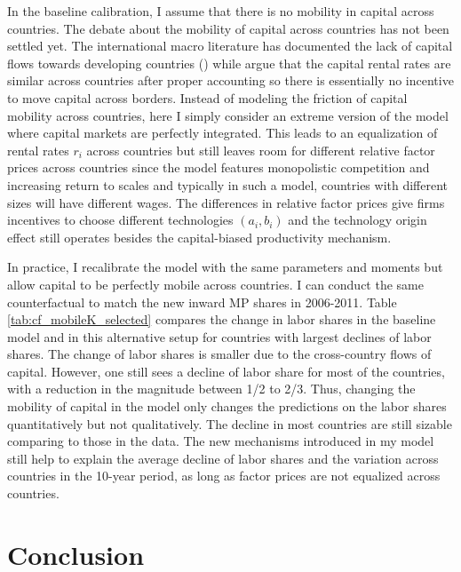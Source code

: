 \documentclass[notitlepage,11pt]{article}%
\begin{document}
In the baseline calibration, I assume that there is no mobility in capital
across countries. The debate about the mobility of capital across countries
has not been settled yet. The international macro literature has documented
the lack of capital flows towards developing countries (\cite{lucas_why_1990})
while \cite{caselli_marginal_2007} argue that the capital rental rates are
similar across countries after proper accounting so there is essentially no
incentive to move capital across borders. Instead of modeling the friction of
capital mobility across countries, here I simply consider an extreme version
of the model where capital markets are perfectly integrated. This leads to an
equalization of rental rates $r_{i}$ across countries but still leaves room
for different relative factor prices across countries since the model features
monopolistic competition and increasing return to scales and typically in such
a model, countries with different sizes will have different wages. The
differences in relative factor prices give firms incentives to choose
different technologies $\left(  a_{i},b_{i}\right)  $ and the technology
origin effect still operates besides the capital-biased productivity mechanism.

In practice, I recalibrate the model with the same parameters and moments but
allow capital to be perfectly mobile across countries. I can conduct the same
counterfactual to match the new inward MP shares in 2006-2011. Table
\ref{tab:cf_mobileK_selected} compares the change in labor shares in the
baseline model and in this alternative setup for countries with largest
declines of labor shares. The change of labor shares is smaller due to the
cross-country flows of capital. However, one still sees a decline of labor
share for most of the countries, with a reduction in the magnitude between 1/2
to 2/3. Thus, changing the mobility of capital in the model only changes the
predictions on the labor shares quantitatively but not qualitatively. The
decline in most countries are still sizable comparing to those in the data.
The new mechanisms introduced in my model still help to explain the average
decline of labor shares and the variation across countries in the 10-year
period, as long as factor prices are not equalized across countries.%

%


\section{Conclusion}
\end{document}
